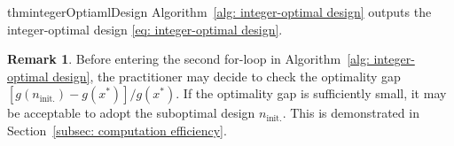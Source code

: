 \documentclass{article}
\theoremstyle{definition}
\newtheorem{remark}[theorem]{Remark}
\begin{document}
\begin{restatable}{thm}{integerOptiamlDesign} \label{thm: integer-optimal Design}
    Algorithm~\ref{alg: integer-optimal design} outputs the integer-optimal design \eqref{eq: integer-optimal design}.
\end{restatable}


\begin{remark}
    Before entering the second for-loop in Algorithm~\ref{alg: integer-optimal design}, the practitioner may decide to check the optimality gap $[g(n_{\text{init.}}) - g(x^*)]/g(x^*)$. If the optimality gap is sufficiently small, it may be acceptable to adopt the suboptimal design $n_{\text{init.}}$. This is demonstrated in Section~\ref{subsec: computation efficiency}.
\end{remark}
\end{document}
